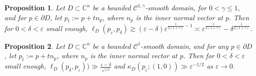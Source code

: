 \documentclass[10pt,a4paper]{amsart}
\newtheorem{prop}{Proposition}
\def\C{\mathbb C}
\newcommand{\eps}{\varepsilon}
\begin{document}
\begin{prop}
\label{onegamma}
Let $D \subset \C^n$ be a bounded $\mathcal C^{1,\gamma}$-smooth  domain, for $0<\gamma \le 1$, and
for $p\in \partial D$, let $p_t := p+t n_p$, where $n_p$ is the inner normal vector at $p$. Then for 
$0< \delta < \eps$ small enough, $\ell_D(p_\eps,p_\delta) \gtrsim (\eps-\delta)\eps^{\frac1{2(1+\gamma)}-1}
\asymp \eps^{\frac1{2(1+\gamma)}} - \delta^{\frac1{2(1+\gamma)}}$.
\end{prop}

\begin{prop}
\label{C1}
Let $D \subset \C^n$ be a bounded $\mathcal C^{1}$-smooth  domain, and
for any $p\in \partial D$, let $p_t := p+t n_p$, where $n_p$ is the inner normal vector at $p$. Then for
$0< \delta < \eps$ small enough, $\ell_D(p_\delta,p_\eps)) \gg \frac{\eps-\delta}{\eps^{1/2}}$ and $\kappa_D (p_\eps; (1,0))\gg \eps^{-1/2}$
as $\eps\to0$.
\end{prop}
\end{document}
